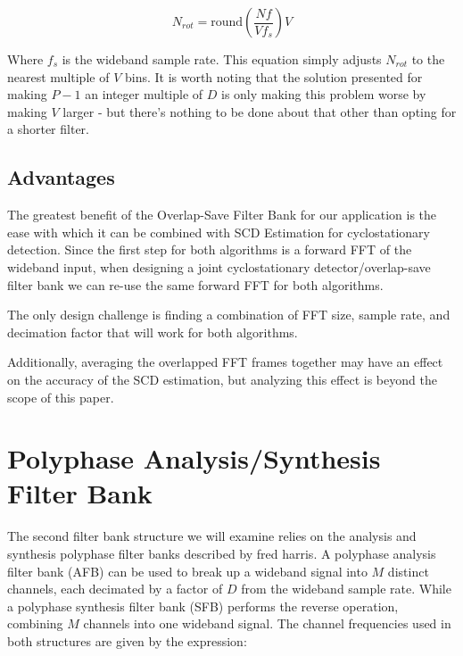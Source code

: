\documentclass[12pt]{article}
\begin{document}
\begin{equation}
    N_{rot} = \text{round}\left( \frac{Nf}{Vf_s} \right) V
\end{equation}

Where $f_s$ is the wideband sample rate. This equation simply adjusts $N_{rot}$
to the nearest multiple of $V$ bins. It is worth noting that the solution
presented for making $P-1$ an integer multiple of $D$ is only making this
problem worse by making $V$ larger - but there's nothing to be done about that
other than opting for a shorter filter.

\subsection{Advantages}
\label{sec:os_advantages}

The greatest benefit of the Overlap-Save Filter Bank for our application is the
ease with which it can be combined with SCD Estimation for cyclostationary
detection. Since the first step for both algorithms is a forward FFT of the
wideband input, when designing a joint cyclostationary detector/overlap-save
filter bank we can re-use the same forward FFT for both algorithms.


The only design challenge is finding a combination of FFT size, sample rate,
and decimation factor that will work for both algorithms.



Additionally, averaging the overlapped FFT frames together may have an effect
on the accuracy of the SCD estimation, but analyzing this effect is beyond the
scope of this paper.


\section{Polyphase Analysis/Synthesis Filter Bank}
\label{sec:poly_chan}
The second filter bank structure we will examine relies on the analysis and
synthesis polyphase filter banks described by fred harris\cite{Harris1}.
A polyphase analysis filter bank (AFB) can be used to break up a wideband signal into
$M$ distinct channels, each decimated by a factor of $D$ from the wideband
sample rate.  While a polyphase synthesis filter bank (SFB) performs the reverse
operation, combining $M$ channels into one wideband signal. The channel
frequencies used in both structures are given by the expression:
\end{document}
